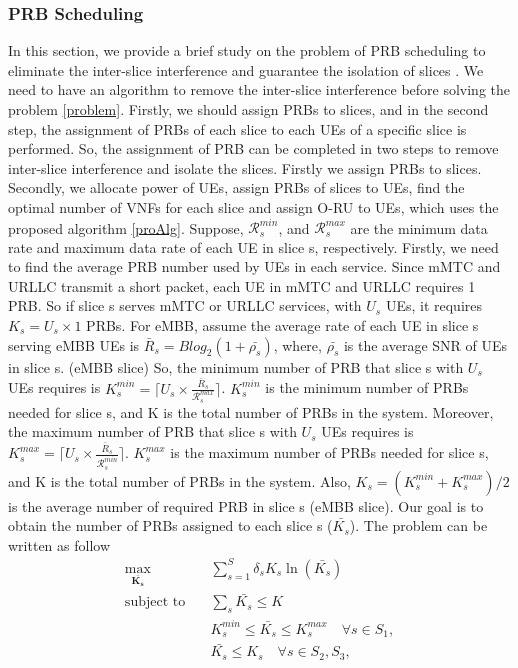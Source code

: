 \documentclass[lettersize,journal]{IEEEtran}
\begin{document}
\subsubsection{PRB Scheduling}\label{prb}
 In this section, we provide a brief study on the problem of PRB scheduling to eliminate  the inter-slice interference and guarantee the isolation of slices \cite{marabissi2019highly}.
We need to have an algorithm to remove the inter-slice interference before solving the problem \ref{problem}. Firstly, we should assign PRBs to slices, and in the second step, the assignment of PRBs of each slice to each UEs of a specific slice is performed. So, the assignment of PRB can be completed in two steps to remove inter-slice interference and isolate the slices. Firstly we assign PRBs to slices. Secondly, we allocate power of UEs, assign PRBs of slices to UEs, find the optimal number of VNFs for each slice and assign O-RU to UEs, which uses the proposed algorithm \ref{proAlg}.
Suppose, $\mathcal{R}_{{s}}^{min}$, and $\mathcal{R}_{{s}}^{max}$ are the minimum data rate and maximum data rate of each UE in slice s, respectively.
Firstly, we need to find the average PRB number used by UEs in each service. Since mMTC and URLLC transmit a short packet, each UE in mMTC and URLLC requires 1 PRB. So if slice s serves mMTC or URLLC services, with $U_s$ UEs, it requires $K_s = U_s \times 1$ PRBs. For eMBB, assume the average rate of each UE in slice s serving eMBB UEs is $\bar{R}_s = Blog_2(1 + \bar{\rho_s})$, where, $\bar{\rho_s}$ is the average SNR of UEs in slice s. (eMBB slice)
So, the minimum number of PRB that slice s with $U_s$ UEs requires is $K_s^{min} = \lceil{U_s \times \frac{\bar{R}_s}{\mathcal{R}_{{s}}^{max}}}\rceil$. $K_s^{min} $ is the minimum number of PRBs needed for slice s, and K is the total number of PRBs in the system.
Moreover, the maximum number of PRB that slice s with $U_s$ UEs requires is $K_s^{max} = \lceil{U_s \times \frac{\bar{R}_s}{\mathcal{R}_{{s}}^{min}}}\rceil$. $K_s^{max} $ is the maximum number of PRBs needed for slice s, and K is the total number of PRBs in the system. Also, $K_s = (K_s^{min}+K_s^{max})/2$ is the average number of required PRB in slice s (eMBB slice).
Our goal is to obtain the number of PRBs assigned to each slice s ($\bar{K_s}$).
The problem can be written as follow
\begin{subequations}\label{prob:prb}
\begin{alignat}{4}
\max\limits_{\boldsymbol{\bar{K_s}}} \quad &  \sum_{s=1}^{S}\delta_s K_s \ln(\bar{K_s}) \ \\
\text{subject to} \quad  & \sum_s{\bar{K_s}} \leq K
 \label{prb0} \\
& K_s^{min} \leq \bar{K_s}  \leq K_s^{max}  \quad \forall s \in S_1,\label{prb1} \\
&  \bar{K_s} \leq K_s  \quad \forall s \in S_2, S_3,\label{prb2}
\end{alignat}
\label{constraints}
\end{subequations}
\end{document}

